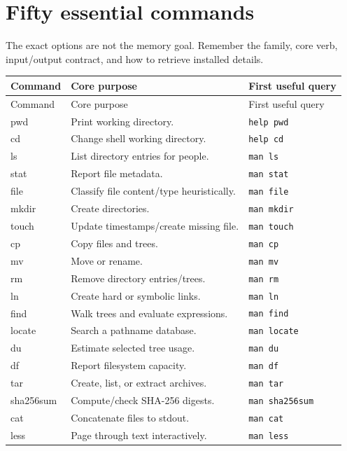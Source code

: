 \documentclass[11pt,oneside,openany]{book}
\begin{document}
\section{Fifty essential commands}
The exact options are not the memory goal. Remember the family, core verb, input/output contract, and how to retrieve installed details.

\begin{longtable}{>{\ttfamily}p{}p{}p{}}
\toprule
Command & Core purpose & First useful query \\
\midrule
\endfirsthead\toprule Command & Core purpose & First useful query \\
\midrule\endhead
pwd & Print working directory. & \texttt{help pwd} \\
cd & Change shell working directory. & \texttt{help cd} \\
ls & List directory entries for people. & \texttt{man ls} \\
stat & Report file metadata. & \texttt{man stat} \\
file & Classify file content/type heuristically. & \texttt{man file} \\
mkdir & Create directories. & \texttt{man mkdir} \\
touch & Update timestamps/create missing file. & \texttt{man touch} \\
cp & Copy files and trees. & \texttt{man cp} \\
mv & Move or rename. & \texttt{man mv} \\
rm & Remove directory entries/trees. & \texttt{man rm} \\
ln & Create hard or symbolic links. & \texttt{man ln} \\
find & Walk trees and evaluate expressions. & \texttt{man find} \\
locate & Search a pathname database. & \texttt{man locate} \\
du & Estimate selected tree usage. & \texttt{man du} \\
df & Report filesystem capacity. & \texttt{man df} \\
tar & Create, list, or extract archives. & \texttt{man tar} \\
sha256sum & Compute/check SHA-256 digests. & \texttt{man sha256sum} \\
cat & Concatenate files to stdout. & \texttt{man cat} \\
less & Page through text interactively. & \texttt{man less} \\

\end{longtable}
\end{document}
